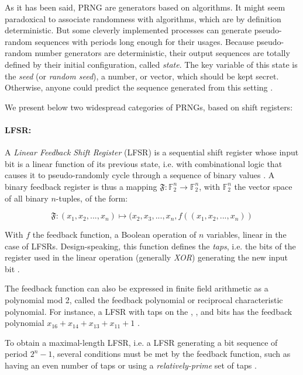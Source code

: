 \documentclass{llncs}
\begin{document}
As it has been said, PRNG are generators based on algorithms. It might seem paradoxical to associate randomness with algorithms, which are by definition deterministic. But some cleverly implemented processes can generate pseudo-random sequences with periods long enough for their usages. Because pseudo-random number generators are deterministic, their output sequences are totally defined by their initial configuration, called \emph{state}. The key variable of this state is the \emph{seed} (or \emph{random seed}), a number, or vector, which should be kept secret. Otherwise, anyone could predict the sequence generated from this setting \cite{w-rng,down}.

We present below two widespread categories of PRNGs, based on shift registers:


\paragraph{LFSR:}


A \emph{Linear Feedback Shift Register} (LFSR) is a sequential shift register whose input bit is a linear function of its previous state, i.e. with combinational logic that causes it to pseudo-randomly cycle through a sequence of binary values \cite{ray:and,joux}. A binary feedback register is thus a mapping $\mathfrak{F}:\mathbb{F}_2^n \to \mathbb{F}_2^n$, with $\mathbb{F}_2^n$ the vector space of all binary $n$-tuples, of the form:

$$\mathfrak{F}:(x_1, x_2, ..., x_n)\mapsto (x_2, x_3, ..., x_n, f((x_1, x_2, ..., x_n))$$

With $f$ the feedback function, a Boolean operation of $n$ variables, linear in the case of LFSRs. Design-speaking, this function defines the \emph{taps}, i.e. the bits of the register used in the linear operation (generally \textit{XOR}) generating the new input bit \cite{szmi,joux}.

The feedback function can also be expressed in finite field arithmetic as a polynomial mod 2, called the feedback polynomial or reciprocal characteristic polynomial. For instance, a LFSR with taps on the , ,  and  bits has the feedback polynomial $x_{16} + x_{14} + x_{13} + x_{11} + 1$ \cite{w-lfsr}\cite{joux}.

To obtain a maximal-length LFSR, i.e. a LFSR generating a bit sequence of period $2^n-1$, several conditions must be met by the feedback function, such as having an even number of taps or using a \textit{relatively-prime} set of taps \cite{w-lfsr}\cite{joux}.
\end{document}
